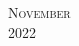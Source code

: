 \documentclass[10pt]{article}
\begin{document}
\begin{calendar}{\textwidth}



\finishCalendar
\end{calendar}

\clearpage

\begin{center}
	\textsc{\LARGE November}\\ %
	\textsc{\large 2022} %
\end{center}

\end{document}
